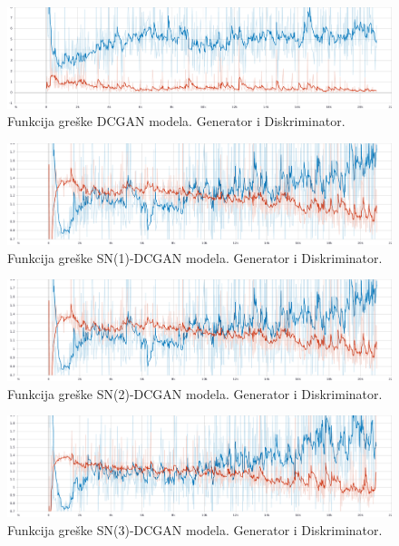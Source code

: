 \documentclass[12pt, a4paper]{article}
\begin{document}
\begin{figure}[H]
	\centerline{\includegraphics[width=1.5\linewidth]{DCGAN_loss.pdf}}
	\caption{Funkcija greške DCGAN modela. \textcolor{tb-blue}{Generator} i  \textcolor{tb-red}{Diskriminator}.}
	\label{fig:DCGAN_loss}
\end{figure}
\begin{figure}[H]
	\centerline{\includegraphics[width=1.5\linewidth]{SN(1)-DCGAN_loss.pdf}}
	\caption{Funkcija greške SN(1)-DCGAN modela. \textcolor{tb-blue}{Generator} i  \textcolor{tb-red}{Diskriminator}.}
	\label{fig:SN(1)-DCGAN_loss}
\end{figure}
\begin{figure}[H]
	\centerline{\includegraphics[width=1.5\linewidth]{SN(2)-DCGAN_loss.pdf}}
	\caption{Funkcija greške SN(2)-DCGAN modela. \textcolor{tb-blue}{Generator} i  \textcolor{tb-red}{Diskriminator}.}
	\label{fig:SN(2)-DCGAN_loss}
\end{figure}
\begin{figure}[H]
	\centerline{\includegraphics[width=1.5\linewidth]{SN(3)-DCGAN_loss.pdf}}
	\caption{Funkcija greške SN(3)-DCGAN modela. \textcolor{tb-blue}{Generator} i  \textcolor{tb-red}{Diskriminator}.}
	\label{fig:SN(3)-DCGAN_loss}
\end{figure}
\end{document}
